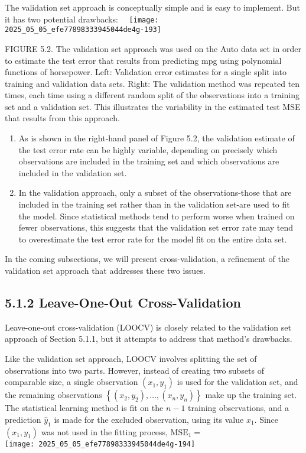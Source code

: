 \documentclass[10pt]{article}
\begin{document}
The validation set approach is conceptually simple and is easy to implement. But it has two potential drawbacks:\
\
\texttt{[image: 2025\_05\_05\_efe77898333945044de4g-193]}

FIGURE 5.2. The validation set approach was used on the Auto data set in order to estimate the test error that results from predicting mpg using polynomial functions of horsepower. Left: Validation error estimates for a single split into training and validation data sets. Right: The validation method was repeated ten times, each time using a different random split of the observations into a training set and a validation set. This illustrates the variability in the estimated test MSE that results from this approach.

\begin{enumerate}
  \item As is shown in the right-hand panel of Figure 5.2, the validation estimate of the test error rate can be highly variable, depending on precisely which observations are included in the training set and which observations are included in the validation set.
  \item In the validation approach, only a subset of the observations-those that are included in the training set rather than in the validation set-are used to fit the model. Since statistical methods tend to perform worse when trained on fewer observations, this suggests that the validation set error rate may tend to overestimate the test error rate for the model fit on the entire data set.
\end{enumerate}

In the coming subsections, we will present cross-validation, a refinement of the validation set approach that addresses these two issues.

\subsection*{5.1.2 Leave-One-Out Cross-Validation}
Leave-one-out cross-validation (LOOCV) is closely related to the validation set approach of Section 5.1.1, but it attempts to address that method's drawbacks.

Like the validation set approach, LOOCV involves splitting the set of observations into two parts. However, instead of creating two subsets of comparable size, a single observation $\left(x_{1}, y_{1}\right)$ is used for the validation set, and the remaining observations $\left\{\left(x_{2}, y_{2}\right), \ldots,\left(x_{n}, y_{n}\right)\right\}$ make up the training set. The statistical learning method is fit on the $n-1$ training observations, and a prediction $\hat{y}_{1}$ is made for the excluded observation, using its value $x_{1}$. Since $\left(x_{1}, y_{1}\right)$ was not used in the fitting process, $\mathrm{MSE}_{1}=$\\
\texttt{[image: 2025\_05\_05\_efe77898333945044de4g-194]}
\end{document}
